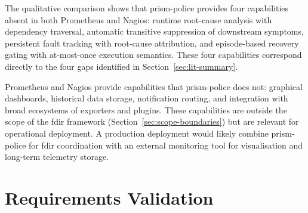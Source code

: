 The qualitative comparison shows that prism-police provides four capabilities absent in both Prometheus and Nagios: runtime root-cause analysis with dependency traversal, automatic transitive suppression of downstream symptoms, persistent fault tracking with root-cause attribution, and episode-based recovery gating with at-most-once execution semantics. These four capabilities correspond directly to the four gaps identified in Section~\ref{sec:lit-summary}.

Prometheus and Nagios provide capabilities that prism-police does not: graphical dashboards, historical data storage, notification routing, and integration with broad ecosystems of exporters and plugins. These capabilities are outside the scope of the \gls{fdir} framework (Section~\ref{sec:scope-boundaries}) but are relevant for operational deployment. A production deployment would likely combine prism-police for \gls{fdir} coordination with an external monitoring tool for visualisation and long-term telemetry storage.

\section{Requirements Validation}\label{sec:requirements-validation}

